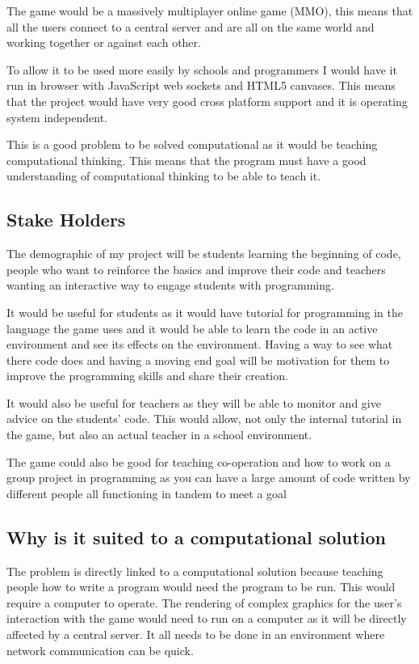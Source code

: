 \documentclass[12pt]{article}
\begin{document}
The game would be a massively multiplayer online game (MMO), this means that all the users connect to a central server and are all on the same world and working together or against each other.

To allow it to be used more easily by schools and programmers I would have it run in browser with JavaScript web sockets and HTML5 canvases. This means that the project would have very good cross platform support and it is operating system independent.

This is a good problem to be solved computational as it would be teaching computational thinking. This means that the program must have a good understanding of computational thinking to be able to teach it.

\subsection{Stake Holders}
The demographic of my project will be students learning the beginning of code, people who want to reinforce the basics and improve their code and teachers wanting an interactive way to engage students with programming. 

It would be useful for students as it would have tutorial for programming in the language the game uses and it would be able to learn the code in an active environment and see its effects on the environment. Having a way to see what there code does and having a moving end goal will be motivation for them to improve the programming skills and share their creation.

It would also be useful for teachers as they will be able to monitor and give advice on the students’ code. This would allow, not only the internal tutorial in the game, but also an actual teacher in a school environment.

The game could also be good for teaching co-operation and how to work on a group project in programming as you can have a large amount of code written by different people all functioning in tandem to meet a goal

\subsection{Why is it suited to a computational solution}
The problem is directly linked to a computational solution because teaching people how to write a program would need the program to be run. This would require a computer to operate. The rendering of complex graphics for the user’s interaction with the game would need to run on a computer as it will be directly affected by a central server. It all needs to be done in an environment where network communication can be quick.
\end{document}
